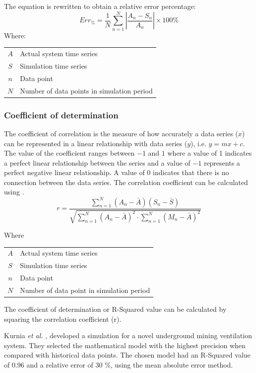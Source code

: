  			The equation is rewritten to obtain a relative error percentage:	
 			\begin{equation}
 			\label{eq: Relative error}
 			Err_{\%} = \dfrac{1}{N}\sum_{n=1}^{N}{\left|\dfrac{A_{n} - S_{n}}{A_{n}}\right| }\times 100 \%
 			\end{equation}
 			Where: \par
 			\begin{table}[!htbp]
 				\centering
 				\begin{tabular}{cl}
 					$A$ & Actual system time series \\
 					$S$ & Simulation time series \\
 					$n$ & Data point \\
 					$N$ & Number of data points in simulation period \\
 				\end{tabular} 
 			\end{table} 
 		\subsubsection{Coefficient of determination}
 		The coefficient of correlation is the measure of how accurately a data series ($ x $) can be represented in a linear relationship with data series ($ y $), i.e. $ y = mx+c$. The value of the coefficient ranges between $ -1 $ and $ 1 $ where a value of 1 indicates a perfect linear relationship between the series and a value of $ -1 $ represents a perfect negative linear relationship. A value of 0 indicates that there is no connection between the data series. The correlation coefficient can be calculated using  \cite{sarin2010comparing}.
 		\clearpage
 		\begin{equation}
 		\label{eq: Correlation coefficient}
 		r = \dfrac{\sum_{n=1}^{N}(A_n - \bar{A})(S_n - \bar{S})}{\sqrt{\sum_{n=1}^{N}(A_n - \bar{A})^2 \cdot \sum_{n=1}^{N}(M_n - \bar{A})^2}}
 		\end{equation}
 		\par
 		Where \par
 		\begin{table}[!htbp]
 			\centering
 			\begin{tabular}{cl}
 				$A$ & Actual system time series \\
 				$S$ & Simulation time series \\
 				$n$ & Data point \\
 				$N$ & Number of data point in simulation period \\
 			\end{tabular} 
 		\end{table}	
 		The coefficient of determination or R-Squared value can be calculated by squaring the correlation coefficient (r). 
 		\par 
 			Kurnia \textit{et al.} \cite{kurnia2014simulation}, \cite{kurnia2014dust} developed a simulation for a novel underground mining ventilation system. They selected the mathematical model with the highest precision when compared with historical data points. The chosen model had an R-Squared value of 0.96 and a relative error of 30 \%, using the mean absolute error method. 
 			
